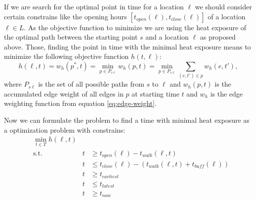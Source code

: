 If we are search for the optimal point in time for a location $\ell$ we should consider certain constrains like the opening hours $[t_{open}(\ell),t_{close}(\ell)]$ of a location $\ell \in L$. As the objective function to minimize we are using the heat exposure of the optimal path between the starting point $s$ and a location $\ell$ as proposed above. Those, finding the point in time with the minimal heat exposure means to minimize the following objective function $h(t, \ell)$:
	\begin{equation}\label{eq:objective-funtion}
		h(\ell, t) = w_h(p^*, t) = \min_{p\in P_{s\ell}} w_h(p, t) = \min_{p\in P_{s\ell}} \sum_{(e, t') \in p} w_h(e, t'),
	\end{equation}
where $P_{s\ell}$ is the set of all possible paths from $s$ to $\ell$ and $w_h(p, t)$ is the accumulated edge weight of all edges in $p$ at starting time $t$ and $w_h$ is the edge weighting function from equation \eqref{eq:edge-weight}. 

Now we can formulate the problem to find a time with minimal heat exposure as a optimization problem with constrains:
\begin{subequations}
	\label{eq:optimal-time}
	\begin{alignat}{2}
	&\min_{t \in T} h(\ell, t) && \label{eq:optimal-time:of} \\
	&\text{s.t.} & t & \geq t_{open}(\ell)-t_{walk}(\ell, t) \label{eq:optimal-time:twm}\\
	&	& t & \leq   t_{close}(\ell)-(t_{walk}(\ell, t)+t_{buff}(\ell))	\label{eq:optimal-time:twe}\\
	&	&  t & \geq t_{earliest} \label{eq:optimal-time:te} \\
	&	&  t & \leq t_{latest} \label{eq:optimal-time:tl} \\
	&  & t  & \geq t_{now} \label{eq:optimal-time:tn} 
	\end{alignat}
\end{subequations}

